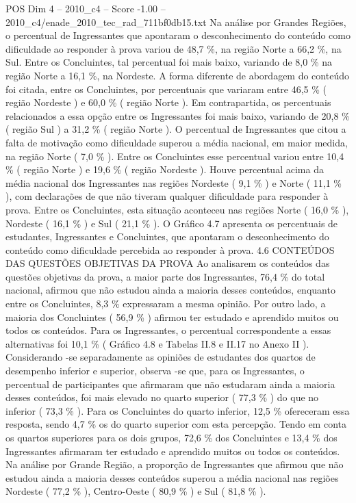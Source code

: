 \begin{textsample}{POS Dim 4 – 2010\_c4 – Score -1.00 – 2010\_c4/enade\_2010\_tec\_rad\_711bf0db15.txt}
Na análise por Grandes Regiões, o percentual de Ingressantes que apontaram o desconhecimento do conteúdo como dificuldade ao responder à prova variou de 48,7 \%, na região Norte a 66,2 \%, na Sul.
Entre os Concluintes, tal percentual foi mais baixo, variando de 8,0 \% na região Norte a 16,1 \%, na Nordeste.
A forma diferente de abordagem do conteúdo foi citada, entre os Concluintes, por percentuais que variaram entre 46,5 \% ( região Nordeste ) e 60,0 \% ( região Norte ).
Em contrapartida, os percentuais relacionados a essa opção entre os Ingressantes foi mais baixo, variando de 20,8 \% ( região Sul ) a 31,2 \% ( região Norte ).
O percentual de Ingressantes que citou a falta de motivação como dificuldade superou a média nacional, em maior medida, na região Norte ( 7,0 \% ).
Entre os Concluintes esse percentual variou entre 10,4 \% ( região Norte ) e 19,6 \% ( região Nordeste ).
Houve percentual acima da média nacional dos Ingressantes nas regiões Nordeste ( 9,1 \% ) e Norte ( 11,1 \% ), com declarações de que não tiveram qualquer dificuldade para responder à prova.
Entre os Concluintes, esta situação aconteceu nas regiões Norte ( 16,0 \% ), Nordeste ( 16,1 \% ) e Sul ( 21,1 \% ).
O Gráfico 4.7 apresenta os percentuais de estudantes, Ingressantes e Concluintes, que apontaram o desconhecimento do conteúdo como dificuldade percebida ao responder à prova. 4.6 CONTEÚDOS DAS QUESTÕES OBJETIVAS DA PROVA Ao analisarem os conteúdos das questões objetivas da prova, a maior parte dos Ingressantes, 76,4 \% do total nacional, afirmou que não estudou ainda a maioria desses conteúdos, enquanto entre os Concluintes, 8,3 \% expressaram a mesma opinião.
Por outro lado, a maioria dos Concluintes ( 56,9 \% ) afirmou ter estudado e aprendido muitos ou todos os conteúdos.
Para os Ingressantes, o percentual correspondente a essas alternativas foi 10,1 \% ( Gráfico 4.8 e Tabelas II.8 e II.17 no Anexo II ).
Considerando -se separadamente as opiniões de estudantes dos quartos de desempenho inferior e superior, observa -se que, para os Ingressantes, o percentual de participantes que afirmaram que não estudaram ainda a maioria desses conteúdos, foi mais elevado no quarto superior ( 77,3 \% ) do que no inferior ( 73,3 \% ).
Para os Concluintes do quarto inferior, 12,5 \% ofereceram essa resposta, sendo 4,7 \% os do quarto superior com esta percepção.
Tendo em conta os quartos superiores para os dois grupos, 72,6 \% dos Concluintes e 13,4 \% dos Ingressantes afirmaram ter estudado e aprendido muitos ou todos os conteúdos.
Na análise por Grande Região, a proporção de Ingressantes que afirmou que não estudou ainda a maioria desses conteúdos superou a média nacional nas regiões Nordeste ( 77,2 \% ), Centro-Oeste ( 80,9 \% ) e Sul ( 81,8 \% ).

\end{textsample}
